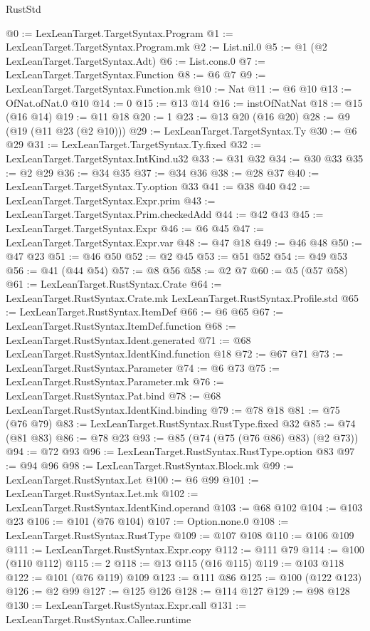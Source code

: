 \begin{lexlean}{RustStd}
\begin{coremodule}
@0 := LexLeanTarget.TargetSyntax.Program
@1 := LexLeanTarget.TargetSyntax.Program.mk
@2 := List.nil.{0}
@5 := @1 (@2 LexLeanTarget.TargetSyntax.Adt)
@6 := List.cons.{0}
@7 := LexLeanTarget.TargetSyntax.Function
@8 := @6 @7
@9 := LexLeanTarget.TargetSyntax.Function.mk
@10 := Nat
@11 := @6 @10
@13 := OfNat.ofNat.{0} @10
@14 := 0
@15 := @13 @14
@16 := instOfNatNat
@18 := @15 (@16 @14)
@19 := @11 @18
@20 := 1
@23 := @13 @20 (@16 @20)
@28 := @9 (@19 (@11 @23 (@2 @10)))
@29 := LexLeanTarget.TargetSyntax.Ty
@30 := @6 @29
@31 := LexLeanTarget.TargetSyntax.Ty.fixed
@32 := LexLeanTarget.TargetSyntax.IntKind.u32
@33 := @31 @32
@34 := @30 @33
@35 := @2 @29
@36 := @34 @35
@37 := @34 @36
@38 := @28 @37
@40 := LexLeanTarget.TargetSyntax.Ty.option @33
@41 := @38 @40
@42 := LexLeanTarget.TargetSyntax.Expr.prim
@43 := LexLeanTarget.TargetSyntax.Prim.checkedAdd
@44 := @42 @43
@45 := LexLeanTarget.TargetSyntax.Expr
@46 := @6 @45
@47 := LexLeanTarget.TargetSyntax.Expr.var
@48 := @47 @18
@49 := @46 @48
@50 := @47 @23
@51 := @46 @50
@52 := @2 @45
@53 := @51 @52
@54 := @49 @53
@56 := @41 (@44 @54)
@57 := @8 @56
@58 := @2 @7
@60 := @5 (@57 @58)
@61 := LexLeanTarget.RustSyntax.Crate
@64 := LexLeanTarget.RustSyntax.Crate.mk LexLeanTarget.RustSyntax.Profile.std
@65 := LexLeanTarget.RustSyntax.ItemDef
@66 := @6 @65
@67 := LexLeanTarget.RustSyntax.ItemDef.function
@68 := LexLeanTarget.RustSyntax.Ident.generated
@71 := @68 LexLeanTarget.RustSyntax.IdentKind.function @18
@72 := @67 @71
@73 := LexLeanTarget.RustSyntax.Parameter
@74 := @6 @73
@75 := LexLeanTarget.RustSyntax.Parameter.mk
@76 := LexLeanTarget.RustSyntax.Pat.bind
@78 := @68 LexLeanTarget.RustSyntax.IdentKind.binding
@79 := @78 @18
@81 := @75 (@76 @79)
@83 := LexLeanTarget.RustSyntax.RustType.fixed @32
@85 := @74 (@81 @83)
@86 := @78 @23
@93 := @85 (@74 (@75 (@76 @86) @83) (@2 @73))
@94 := @72 @93
@96 := LexLeanTarget.RustSyntax.RustType.option @83
@97 := @94 @96
@98 := LexLeanTarget.RustSyntax.Block.mk
@99 := LexLeanTarget.RustSyntax.Let
@100 := @6 @99
@101 := LexLeanTarget.RustSyntax.Let.mk
@102 := LexLeanTarget.RustSyntax.IdentKind.operand
@103 := @68 @102
@104 := @103 @23
@106 := @101 (@76 @104)
@107 := Option.none.{0}
@108 := LexLeanTarget.RustSyntax.RustType
@109 := @107 @108
@110 := @106 @109
@111 := LexLeanTarget.RustSyntax.Expr.copy
@112 := @111 @79
@114 := @100 (@110 @112)
@115 := 2
@118 := @13 @115 (@16 @115)
@119 := @103 @118
@122 := @101 (@76 @119) @109
@123 := @111 @86
@125 := @100 (@122 @123)
@126 := @2 @99
@127 := @125 @126
@128 := @114 @127
@129 := @98 @128
@130 := LexLeanTarget.RustSyntax.Expr.call
@131 := LexLeanTarget.RustSyntax.Callee.runtime

\end{coremodule}
\end{lexlean}
